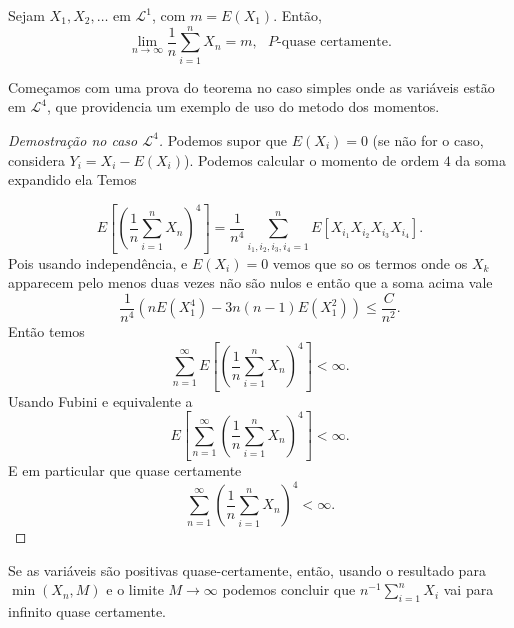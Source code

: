 \begin{theorem}
  \label{t:LFGN}
  Sejam $X_1, X_2, \dots$ \iid em $\mathcal{L}^1$, com $m = E(X_1)$.
  Então,
  \begin{equation}
    \lim_{n \to \infty} \frac{1}{n} \sum_{i=1}^n X_n = m, \text{ $P$-quase certamente.}
  \end{equation}
\end{theorem}

Começamos com uma prova do teorema no caso simples onde as variáveis estão em $\mathcal L^4$, que providencia um exemplo de uso do metodo dos momentos.

\begin{proof}[Demostração no caso $\mathcal L^4$]
Podemos supor que $E(X_i)=0$ (se não for o caso, considera $Y_i=X_i-E(X_i)$).
Podemos calcular o momento de ordem $4$ da soma expandido ela 
Temos 

\begin{equation*}
  E \left[ \left(\frac{1}{n} \sum_{i=1}^n X_n \right)^4 \right]= \frac{1}{n^4} \sum_{i_1,i_2,i_3,i_4=1}^n E[X_{i_1}X_{i_2}X_{i_3}X_{i_4}].
\end{equation*}
Pois usando independência, e $E(X_i)=0$ vemos que so os termos onde os $X_{k}$ apparecem pelo menos duas vezes não são nulos e
então que a soma acima vale
$$\frac{1}{n^4}\left( n E(X^4_1)-3n(n-1) E(X^2_1) \right)\le \frac{C}{n^2}.$$
Então temos 
\begin{equation}
 \sum_{n=1}^{\infty} E \left[ \left(\frac{1}{n} \sum_{i=1}^n X_n \right)^4 \right]<\infty.
\end{equation}
Usando Fubini e equivalente a 
\begin{equation}
 E \left[  \sum_{n=1}^{\infty} \left(\frac{1}{n} \sum_{i=1}^n X_n \right)^4 \right]<\infty.
\end{equation}
E em particular que quase certamente
\begin{equation}
 \sum_{n=1}^{\infty} \left(\frac{1}{n} \sum_{i=1}^n X_n \right)^4<\infty.
\end{equation}

\end{proof}


\begin{remark}
 Se as variáveis são positivas quase-certamente, então, usando o resultado para $\min(X_n,M)$ e o limite $M\to \infty$ 
 podemos concluir que $n^{-1}\sum_{i=1}^n X_i$ vai para infinito quase certamente.
 \end{remark}

